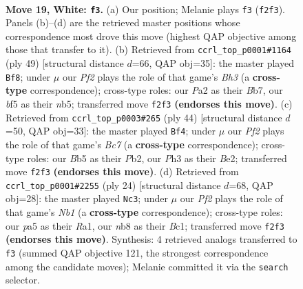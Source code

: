\documentclass[11pt]{article}
\begin{document}
\clearpage

\begin{figure}[p]\centering
\begin{subfigure}{0.46\textwidth}\centering
\resizebox{\linewidth}{!}{%
\newchessgame
\chessboard[
  setfen={rnk3nN/8/1p2p3/pB1p1bpp/3p4/b6P/P1P2PPR/3RK3 w - - 0 19},
  showmover=false,
  pgfstyle=straightmove, color=movearrow, markmove={f2-f3}
]}
\caption{}
\end{subfigure}\hfill
\begin{subfigure}{0.46\textwidth}\centering
\resizebox{\linewidth}{!}{%
\newchessgame
\chessboard[
  setfen={r5k1/pb1p1p2/1p1P2pb/1N5p/7P/P2B2P1/1P3P2/4R1K1 b - - 0 25},
  showmover=false,
  pgfstyle=straightmove, color=movearrow, markmove={h6-f8}
]}
\caption{}
\end{subfigure}
\\[4pt]
\begin{subfigure}{0.46\textwidth}\centering
\resizebox{\linewidth}{!}{%
\newchessgame
\chessboard[
  setfen={4r1k1/1pBn1pp1/2p4p/5b2/p6P/P7/1PPRBPP1/6K1 w - - 5 23},
  showmover=false,
  pgfstyle=straightmove, color=movearrow, markmove={c7-f4}
]}
\caption{}
\end{subfigure}\hfill
\begin{subfigure}{0.46\textwidth}\centering
\resizebox{\linewidth}{!}{%
\newchessgame
\chessboard[
  setfen={r1b1k2r/ppp2ppp/2p5/4P3/6Pb/7P/PPP2P2/RNBR2K1 w - - 0 13},
  showmover=false,
  pgfstyle=straightmove, color=movearrow, markmove={b1-c3}
]}
\caption{}
\end{subfigure}
\caption{\textbf{Move 19, White: \texttt{f3}.} (a) Our position; Melanie plays \texttt{f3} (\texttt{f2f3}). Panels (b)--(d) are the retrieved master positions whose correspondence most drove this move (highest QAP objective among those that transfer to it). (b) Retrieved from \texttt{ccrl\_top\_p0001\#1164} (ply 49) [structural distance $d$=66, QAP obj=35]: the master played \texttt{Bf8}; under $\mu$ our \emph{Pf2} plays the role of that game's \emph{Bh3} (a \textbf{cross-type} correspondence); cross-type roles: our \emph{P}a2 as their \emph{B}b7, our \emph{b}f5 as their \emph{n}b5; transferred move \texttt{f2f3} \textbf{(endorses this move)}. (c) Retrieved from \texttt{ccrl\_top\_p0003\#265} (ply 44) [structural distance $d$=50, QAP obj=33]: the master played \texttt{Bf4}; under $\mu$ our \emph{Pf2} plays the role of that game's \emph{Bc7} (a \textbf{cross-type} correspondence); cross-type roles: our \emph{B}b5 as their \emph{P}b2, our \emph{P}h3 as their \emph{B}e2; transferred move \texttt{f2f3} \textbf{(endorses this move)}. (d) Retrieved from \texttt{ccrl\_top\_p0001\#2255} (ply 24) [structural distance $d$=68, QAP obj=28]: the master played \texttt{Nc3}; under $\mu$ our \emph{Pf2} plays the role of that game's \emph{Nb1} (a \textbf{cross-type} correspondence); cross-type roles: our \emph{p}a5 as their \emph{R}a1, our \emph{n}b8 as their \emph{B}c1; transferred move \texttt{f2f3} \textbf{(endorses this move)}. Synthesis: 4 retrieved analogs transferred to \texttt{f3} (summed QAP objective 121, the strongest correspondence among the candidate moves); Melanie committed it via the \texttt{search} selector.}
\label{fig:thought-m36}
\end{figure}
\end{document}
